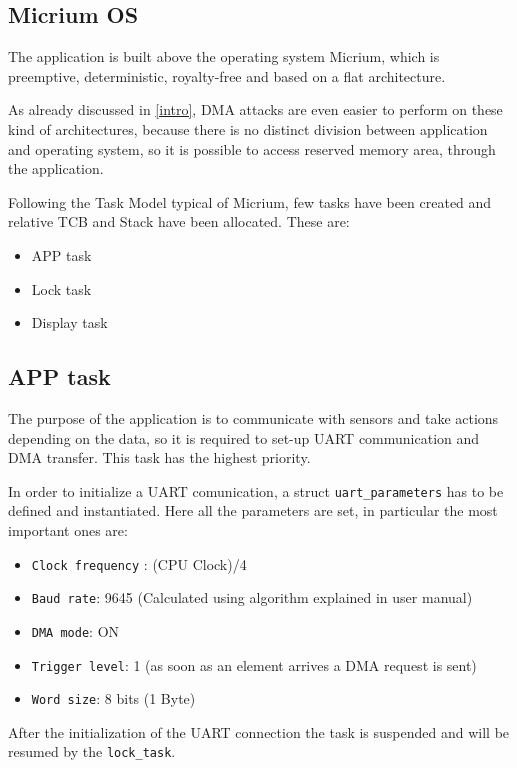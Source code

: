 \subsection{Micrium OS}
The application is built above the operating system Micrium, which is preemptive, deterministic, royalty-free and based on a flat architecture. 

As already discussed in \ref{intro}, DMA attacks are even easier to perform on these kind of architectures, because there is no distinct division between application and operating system, so it is possible to access reserved memory area, through the application.

Following the Task Model typical of Micrium, few tasks have been created and relative TCB and Stack have been allocated. These are:
\begin{itemize}
    \item APP task 
    \item Lock task
    \item Display task
\end{itemize}

\subsection{APP task}
The purpose of the application is to communicate with sensors and take actions depending on the data, so it is required to set-up UART communication and DMA transfer. This task has the highest priority.

In order to initialize a UART comunication, a struct \texttt{uart\_parameters} has to be defined and instantiated. Here all the parameters are set, in particular the most important ones are:
\begin{itemize}
    \item \texttt{Clock frequency} : (CPU Clock)/4
    \item \texttt{Baud rate}: 9645 (Calculated using algorithm explained in user manual)
    \item \texttt{DMA mode}: ON
    \item \texttt{Trigger level}: 1 (as soon as an element arrives a DMA request is sent)
    \item \texttt{Word size}: 8 bits (1 Byte)
\end{itemize}

After the initialization of the UART connection the task is suspended and will be resumed by the \texttt{lock\_task}.

